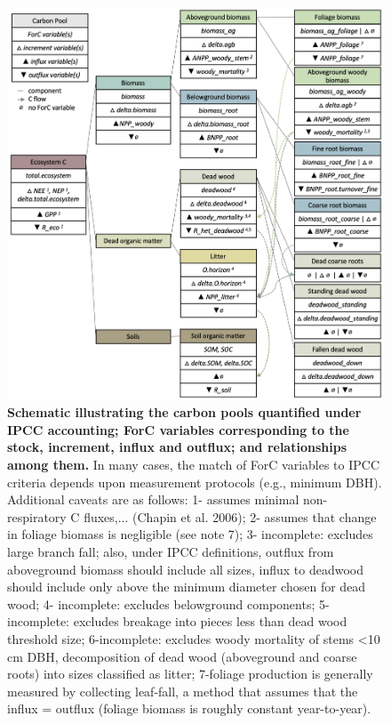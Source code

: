\documentclass[, manuscript]{copernicus}
\begin{document}
\clearpage
\begin{figure}
\includegraphics[width=15cm]{figures_tables/C_variable_mapping} \caption{\textbf{Schematic illustrating the carbon pools quantified under IPCC accounting; ForC variables corresponding to the stock, increment, influx and outflux; and relationships among them.} In many cases, the match of ForC variables to IPCC criteria depends upon measurement protocols (e.g., minimum DBH). Additional caveats are as follows: 1- assumes minimal non-respiratory C fluxes,... (Chapin et al. 2006); 2- assumes that change in foliage biomass is negligible (see note 7); 3- incomplete: excludes large branch fall; also, under IPCC definitions, outflux from aboveground biomass should include all sizes, influx to deadwood should include only above the minimum diameter chosen for dead wood; 4- incomplete: excludes belowground components;  5-incomplete: excludes breakage into pieces less than dead wood threshold size; 6-incomplete: excludes woody mortality of stems <10 cm DBH, decomposition of dead wood (aboveground and coarse roots) into sizes classified as litter; 7-foliage production is generally measured by collecting leaf-fall, a method that assumes that the influx = outflux (foliage biomass is roughly constant year-to-year).}\label{fig:unnamed-chunk-1}
\end{figure}
\end{document}
